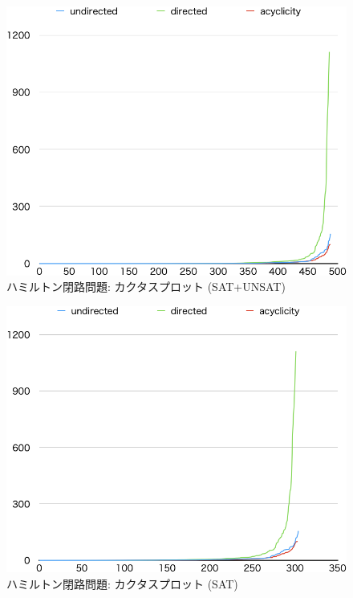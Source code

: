 
\begin{figure}[tb]
\begin{center}
  \includegraphics[width=0.6\linewidth]{fig/cactus.png}
\caption{ハミルトン閉路問題: カクタスプロット (\textsf{SAT+UNSAT})}
\label{cactus}
\end{center}
\end{figure}

\begin{figure}[tb]
\begin{center}
  \includegraphics[width=0.6\linewidth]{fig/cactussat.png}
\caption{ハミルトン閉路問題: カクタスプロット (\textsf{SAT})}
\label{cactussat}
\end{center}
\end{figure}

